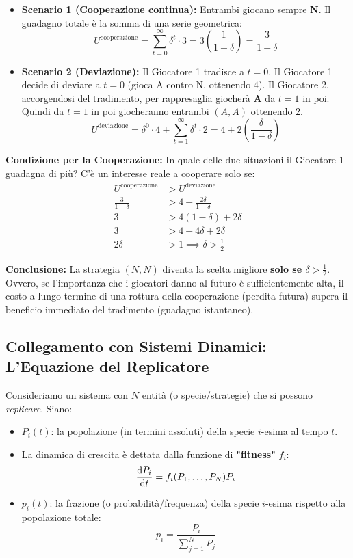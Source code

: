 \documentclass[openany]{book}
\theoremstyle{definition}
\theoremstyle{remark}
\begin{document}
\begin{itemize}
    \item \textbf{Scenario 1 (Cooperazione continua):} Entrambi giocano sempre \textbf{N}.
    Il guadagno totale è la somma di una serie geometrica:
    \begin{equation*}
        U^{\text{cooperazione}} = \sum_{t=0}^{\infty} \delta^t \cdot 3 = 3 \left( \frac{1}{1-\delta} \right) = \frac{3}{1-\delta}
    \end{equation*}
    
    \item \textbf{Scenario 2 (Deviazione):} Il Giocatore 1 tradisce a $t=0$.
    Il Giocatore 1 decide di deviare a $t=0$ (gioca A contro N, ottenendo $4$). Il Giocatore 2, accorgendosi del tradimento, per rappresaglia giocherà \textbf{A} da $t=1$ in poi. Quindi da $t=1$ in poi giocheranno entrambi $(A,A)$ ottenendo $2$.
    \begin{equation*}
        U^{\text{deviazione}} = \delta^0 \cdot 4 + \sum_{t=1}^{\infty} \delta^t \cdot 2 = 4 + 2 \left( \frac{\delta}{1-\delta} \right)
    \end{equation*}
\end{itemize}

\textbf{Condizione per la Cooperazione:} In quale delle due situazioni il Giocatore 1 guadagna di più? C'è un interesse reale a cooperare solo se:
\begin{align*}
    U^{\text{cooperazione}} &> U^{\text{deviazione}} \\
    \frac{3}{1-\delta} &> 4 + \frac{2\delta}{1-\delta} \\
    3 &> 4(1-\delta) + 2\delta \\
    3 &> 4 - 4\delta + 2\delta \\
    2\delta &> 1 \implies \delta > \frac{1}{2}
\end{align*}

\textbf{Conclusione:} La strategia $(N,N)$ diventa la scelta migliore \textbf{solo se $\delta > \frac{1}{2}$}. Ovvero, se l'importanza che i giocatori danno al futuro è sufficientemente alta, il costo a lungo termine di una rottura della cooperazione (perdita futura) supera il beneficio immediato del tradimento (guadagno istantaneo).


\subsection*{Collegamento con Sistemi Dinamici: L'Equazione del Replicatore}

Consideriamo un sistema con $N$ entità (o specie/strategie) che si possono \textit{replicare}.
Siano:
\begin{itemize}
    \item $P_i(t)$: la popolazione (in termini assoluti) della specie $i$-esima al tempo $t$.
    \item La dinamica di crescita è dettata dalla funzione di \textbf{"fitness"} $f_i$:
    $$ \dv{P_i}{t} = f_i(P_1, \dots, P_N) P_i $$
    \item $p_i(t)$: la frazione (o probabilità/frequenza) della specie $i$-esima rispetto alla popolazione totale:
    $$ p_i = \frac{P_i}{\sum_{j=1}^N P_j} $$
\end{itemize}
\end{document}
